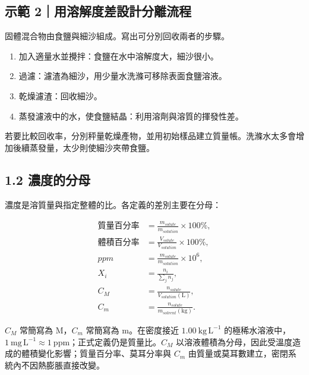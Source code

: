 \documentclass[11pt,a4paper]{article}
\providecommand{\tightlist}{%
  \setlength{\itemsep}{0pt}\setlength{\parskip}{0pt}}
\begin{document}
\begin{HandoutWorkedExample}

\subsection{示範 2｜用溶解度差設計分離流程}\label{ux793aux7bc4-2ux7528ux6eb6ux89e3ux5ea6ux5deeux8a2dux8a08ux5206ux96e2ux6d41ux7a0b}

固體混合物由食鹽與細沙組成。寫出可分別回收兩者的步驟。

\begin{enumerate}
\def\labelenumi{\arabic{enumi}.}
\tightlist
\item
  加入適量水並攪拌：食鹽在水中溶解度大，細沙很小。
\item
  過濾：濾渣為細沙，用少量水洗滌可移除表面食鹽溶液。
\item
  乾燥濾渣：回收細沙。
\item
  蒸發濾液中的水，使食鹽結晶：利用溶劑與溶質的揮發性差。
\end{enumerate}

若要比較回收率，分別秤量乾燥產物，並用初始樣品建立質量帳。洗滌水太多會增加後續蒸發量，太少則使細沙夾帶食鹽。

\end{HandoutWorkedExample}

\subsection{1.2 濃度的分母}\label{ux6fc3ux5ea6ux7684ux5206ux6bcd}

濃度是溶質量與指定整體的比。各定義的差別主要在分母：

\[
\begin{aligned}
\text{質量百分率}&=\frac{m_{solute}}{m_{solution}}\times100\%,\\
\text{體積百分率}&=\frac{V_{solute}}{V_{solution}}\times100\%,\\
ppm&=\frac{m_{solute}}{m_{solution}}\times10^6,\\
X_i&=\frac{n_i}{\sum_j n_j},\\
C_M&=\frac{n_{solute}}{V_{solution}(\mathrm L)},\\
C_m&=\frac{n_{solute}}{m_{solvent}(\mathrm{kg})}.
\end{aligned}
\]

\(C_M\) 常簡寫為 M，\(C_m\) 常簡寫為 m。在密度接近 \(1.00\ \mathrm{kg\,L^{-1}}\) 的極稀水溶液中，\(1\ \mathrm{mg\,L^{-1}}\approx1\ \mathrm{ppm}\)；正式定義仍是質量比。\(C_M\) 以溶液體積為分母，因此受溫度造成的體積變化影響；質量百分率、莫耳分率與 \(C_m\) 由質量或莫耳數建立，密閉系統內不因熱膨脹直接改變。
\end{document}
